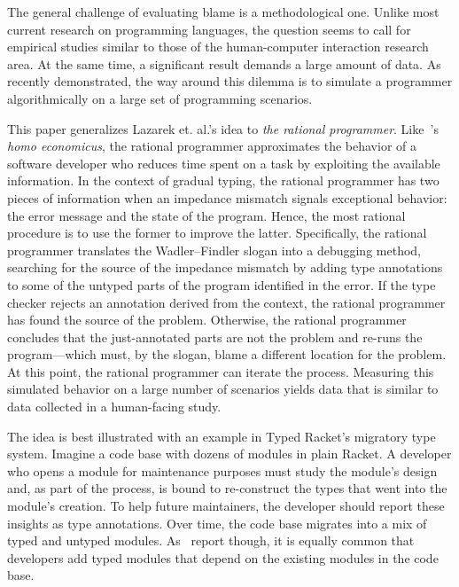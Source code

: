 
The general challenge of evaluating blame is a methodological one. Unlike most
current research on programming languages, the question seems to call for
empirical studies similar to those of the human-computer interaction research
area. At the same time, a significant result demands a large amount of
data. As~\citet{lksfd-popl-2020} recently demonstrated, the way around this
dilemma is to simulate a programmer algorithmically on a large set
of programming scenarios.



This paper generalizes Lazarek et. al.'s idea to {\em the rational
programmer\/}.  Like~\citet{mill1874essays}'s {\it homo economicus\/}, the
rational programmer approximates the behavior of a software developer who
reduces time spent on a task by exploiting the available information. In the
context of gradual typing, the rational programmer has two pieces of information
when an impedance mismatch signals exceptional behavior: the error message and
the state of the program. Hence, the most rational procedure is to use the
former to improve the latter. Specifically, the rational programmer translates
the Wadler--Findler slogan into a debugging method, searching for the source of
the impedance mismatch by adding type annotations to some of the untyped parts
of the program identified in the error.  If the type checker rejects an
annotation derived from the context, the rational programmer has found the
source of the problem.  Otherwise, the rational programmer concludes that the
just-annotated parts are not the problem and re-runs the program---which must,
by the slogan, blame a different location for the problem. At this point, the
rational programmer can iterate the process.  Measuring this simulated behavior
on a large number of scenarios yields data that is similar to data collected in
a human-facing study.

The idea is best illustrated with an example in Typed Racket's migratory type
system. Imagine a code base with dozens of modules in plain Racket. A developer
who opens a module for maintenance purposes must study the module's design and,
as part of the process, is bound to re-construct the types that went into the
module's creation.  To help future maintainers, the developer should report
these insights as type annotations. Over time, the code base migrates into a mix
of typed and untyped modules. As~\citet{tfffgksst-snapl-2017} report though,
it is equally common that developers add typed modules that depend on
the existing modules in the code base.

